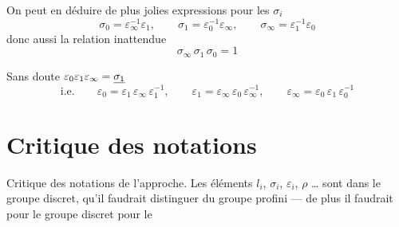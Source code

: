 \documentclass[11pt,a4paper]{article}
\begin{document}
On peut en déduire de plus jolies expressions pour les $\sigma_i$
\[
\sigma_0 = \varepsilon_\infty^{-1} \varepsilon_1, \qquad
\sigma_1 = \varepsilon_0^{-1} \varepsilon_\infty, \qquad
\sigma_\infty = \varepsilon_1^{-1} \varepsilon_0
\]
donc aussi la relation inattendue
\[
\sigma_\infty\, \sigma_1\, \sigma_0 = 1
\]


Sans doute $\varepsilon_0 \varepsilon_1 \varepsilon_\infty = \uncertain{\sigma_1}$
\[
\text{i.e.} \qquad
\varepsilon_0 = \varepsilon_1\, \varepsilon_\infty\, \varepsilon_1^{-1}, \qquad
\varepsilon_1 = \varepsilon_\infty\, \varepsilon_0\, \varepsilon_\infty^{-1}, \qquad
\varepsilon_\infty = \varepsilon_0\, \varepsilon_1\, \varepsilon_0^{-1}
\]


\section{Critique des notations}


Critique des notations  de l'approche. Les éléments $l_i$,
$\sigma_i$, $\varepsilon_i$, $\rho$ … sont dans le groupe discret, qu'il
faudrait distinguer du groupe profini — de plus il faudrait pour le groupe
discret  \ill{} pour le

\end{document}

